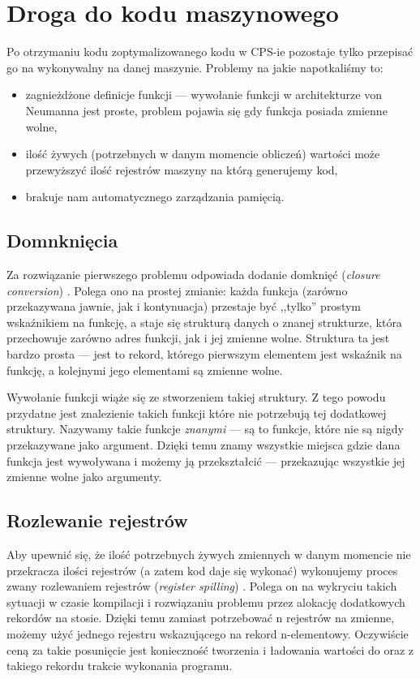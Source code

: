 \documentclass[11pt]{scrartcl}
\begin{document}
\section{Droga do kodu maszynowego}
Po otrzymaniu kodu zoptymalizowanego kodu w CPS-ie pozostaje tylko przepisać go
na wykonywalny na danej maszynie. Problemy na jakie napotkaliśmy to:
\begin{itemize}
  \item zagnieżdżone definicje funkcji --- wywołanie funkcji w architekturze von
    Neumanna jest proste, problem pojawia się gdy funkcja posiada zmienne wolne,
\item ilość żywych (potrzebnych w danym momencie obliczeń) wartości może
  przewyższyć ilość rejestrów maszyny na którą generujemy kod,
\item brakuje nam automatycznego zarządzania pamięcią.
\end{itemize}


\subsection{Domnknięcia}
Za rozwiązanie pierwszego problemu odpowiada dodanie domknięć (\textit{closure
conversion}) \cite{Appel10}. Polega ono na prostej zmianie: każda funkcja (zarówno przekazywana
jawnie, jak i kontynuacja) przestaje być ,,tylko'' prostym wskaźnikiem na funkcję,
a staje się strukturą danych o znanej strukturze, która przechowuje zarówno
adres funkcji, jak i jej zmienne wolne. Struktura ta jest bardzo prosta --- jest
to rekord, którego pierwszym elementem jest wskaźnik na funkcję, a kolejnymi
jego elementami są zmienne wolne.

Wywołanie funkcji wiąże się ze stworzeniem takiej struktury. Z tego powodu
przydatne jest znalezienie takich funkcji które nie potrzebują tej dodatkowej
struktury. Nazywamy takie funkcje \textit{znanymi} --- są to funkcje, które nie są nigdy
przekazywane jako argument. Dzięki temu znamy wszystkie miejsca gdzie dana
funkcja jest wywoływana i możemy ją przekształcić --- przekazując wszystkie jej
zmienne wolne jako argumenty.

\subsection{Rozlewanie rejestrów}
Aby upewnić się, że ilość potrzebnych żywych zmiennych w danym momencie nie
przekracza ilości rejestrów (a zatem kod daje się wykonać) wykonujemy proces
zwany rozlewaniem rejestrów (\textit{register spilling}) \cite{Appel11}. Polega on na wykryciu
takich sytuacji w czasie kompilacji i rozwiązaniu problemu przez alokację
dodatkowych rekordów na stosie. Dzięki temu zamiast potrzebować n rejestrów na
zmienne, możemy użyć jednego rejestru wskazującego na rekord n-elementowy.
Oczywiście ceną za takie posunięcie jest konieczność tworzenia i ładowania
wartości do oraz z takiego rekordu trakcie wykonania programu.
\end{document}
